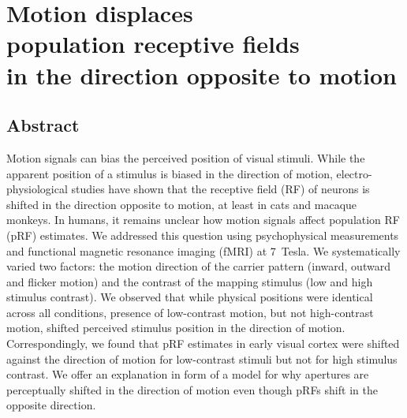 \chapter[Motion displaces population receptive fields\\ in the direction opposite to motion]{Motion displaces\\ population receptive fields\\ in the direction opposite to motion}
\label{ch:chapter04}
\papercitethree

\clearpage{\thispagestyle{empty}\cleardoublepage}

\section{Abstract}
Motion signals can bias the perceived position of visual stimuli. While the apparent position of a stimulus is biased in the direction of motion, electro-physiological studies have shown that the receptive field (RF) of neurons is shifted in the direction opposite to motion, at least in cats and macaque monkeys. In humans, it remains unclear how motion signals affect population RF (pRF) estimates. We addressed this question using psychophysical measurements and functional magnetic resonance imaging (fMRI) at 7~Tesla. We systematically varied two factors: the motion direction of the carrier pattern (inward, outward and flicker motion) and the contrast of the mapping stimulus (low and high stimulus contrast). We observed that while physical positions were identical across all conditions, presence of low-contrast motion, but not high-contrast motion, shifted perceived stimulus position in the direction of motion. Correspondingly, we found that pRF estimates in early visual cortex were shifted against the direction of motion for low-contrast stimuli but not for high stimulus contrast. We offer an explanation in form of a model for why apertures are perceptually shifted in the direction of motion even though pRFs shift in the opposite direction.

